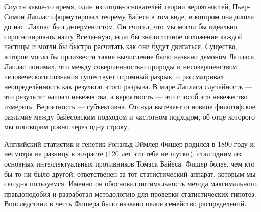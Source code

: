 Спустя какое-то время, один из отцов-основателей теории вероятностей, Пьер-Симон Лаплас сформулировал теорему Байеса в том виде, в котором она дошла до нас.  Лалпас был детерменистом. Он считал, что мы могли бы идеально спрогнозировать нашу Вселенную, если бы знали точное положение каждой частицы и могли бы быстро расчитать как они будут двигаться.   Существо, которое могло бы произвести такие вычисление было названо демоном Лапласа. Лаплас понимал, что между совершенностью природы и несовершенством человеческого познания существует огромный разрыв, и рассматривал неопределённость как результат этого разрыва.  В мире Лапласа случайность --- это результат нашего невежества, а вероятность --- это способ это невежество измерить. Вероятность --- субъективна. Отсюда вытекает основное философское различие между байесовским подходом и частотном подходом, об отце которого мы поговорим ровно через одну строку.

Английский статистик и генетик Рональд Эймлер Фишер родился в 1890 году и, несмотря на разницу в возрасте (120 лет это тебе не шутки), стал одним из основных интеллектуальных противников Томаса Байеса. Фишер более, чем кто бы то ни было другой, ответственен за тот статистический аппарат, которым мы сегодня пользуемся. Именно он обосновал оптимальность метода максимального правдоподобия и разработал методологию для проверки статистических гипотез. Впоследствии в честь Фишера было названо целое семейство распределений. 

